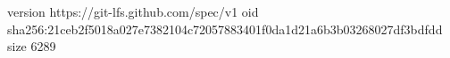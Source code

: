 version https://git-lfs.github.com/spec/v1
oid sha256:21ceb2f5018a027e7382104c72057883401f0da1d21a6b3b03268027df3bdfdd
size 6289
